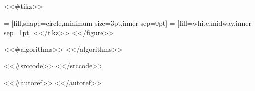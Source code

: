<<#tikz>>
\usetikzlibrary{arrows.meta}  %
\usetikzlibrary{calc}         %

 = [fill,shape=circle,minimum size=3pt,inner sep=0pt]
  = [fill=white,midway,inner sep=1pt]
<</tikz>>
<</figure>>

<<#algorithms>>
\renewcommand{\listalgorithmname}{<<&listname>>}
<</algorithms>>

<<#srccode>>
\lstset{language=Python,style=custompy,captionpos=b}
\renewcommand{\lstlistingname}{<<&lstlistingname>>}
\renewcommand{\lstlistlistingname}{<<&lstlistlistingname>>}
<</srccode>>

<<#autoref>>
\def\partautorefname{<<&part>>}
\def\chapterautorefname{<<&chapter>>}
\def\sectionautorefname{<<&section>>}
\def\subsectionautorefname{<<&subsection>>}
\def\figureautorefname{<<&figure>>}
\def\tableautorefname{<<&table>>}
\def\algorithmautorefname{<<&algorithm>>}
\def\lstinputlistingautorefname{<<&listing>>}
<</autoref>>
